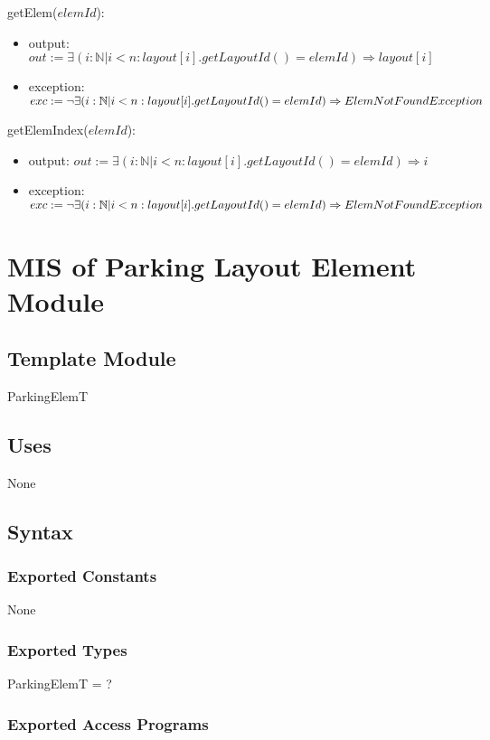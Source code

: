 \documentclass[12pt, titlepage]{article}
\begin{document}
\noindent getElem($elemId$):
\begin{itemize} 
\item output: $out := \exists (i:\mathbb{N}|i < n : layout[i].getLayoutId() =
elemId) \Rightarrow layout[i]$
\item exception: $exc := \neg \exists (i:\mathbb{N}|i < n :
layout[i].getLayoutId() = elemId) \Rightarrow \\ ElemNotFoundException$
\end{itemize}

\noindent getElemIndex($elemId$):
\begin{itemize} 
\item output: $out := \exists (i:\mathbb{N}|i < n : layout[i].getLayoutId() =
elemId) \Rightarrow i$
\item exception: $exc := \neg \exists (i:\mathbb{N}|i < n :
layout[i].getLayoutId() = elemId) \Rightarrow \\ ElemNotFoundException$
\end{itemize}

\newpage

\section{MIS of Parking Layout Element Module} 
\label{parkingLayoutElem:Module}

\subsection{Template Module}
ParkingElemT

\subsection{Uses}
None

\subsection{Syntax}

\subsubsection{Exported Constants}
None

\subsubsection{Exported Types}
ParkingElemT = ?

\subsubsection{Exported Access Programs}
\end{document}

